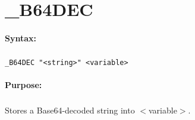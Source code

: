 
\newpage
\section{\_B64DEC}
\label{cmd:_B64DEC}

\paragraph{Syntax:}
\subparagraph{}
\texttt{\_B64DEC "<string>" <variable>}

\paragraph{Purpose:}
\subparagraph{}
Stores a Base64-decoded string into $<$variable$>$.